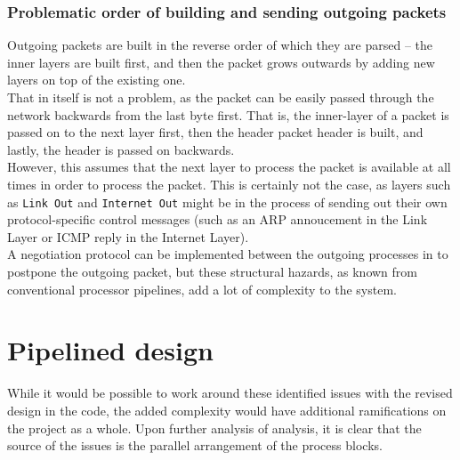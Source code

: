 \subsubsection{Problematic order of building and sending outgoing packets}
Outgoing packets are built in the reverse order of which they are parsed -- the 
inner layers are built first, and then the packet grows outwards by adding new 
layers on top of the existing one.\\
That in itself is not a problem, as the packet can be easily passed through the 
network backwards from the last byte first. That is, the inner-layer of a packet
is passed on to the next layer first, then the header packet header is built, 
and lastly, the header is passed on backwards.\\
However, this assumes that the next layer to process the packet is available at 
all times in order to process the packet. This is certainly not the case, as 
layers such as \texttt{Link Out} and \texttt{Internet Out} might be in the 
process of sending out their own protocol-specific control messages (such as 
an ARP annoucement in the Link Layer or ICMP reply in the Internet Layer).\\
A negotiation protocol can be implemented between the outgoing processes in to 
postpone the outgoing packet, but these structural hazards, as known from 
conventional processor pipelines, add a lot of complexity to the system.






\section{Pipelined design}
While it would be possible to work around these identified issues with the 
revised design in the code, the 
added complexity would have additional ramifications on the project as a whole.
Upon further analysis of analysis, it is clear that the source of the issues is 
the parallel arrangement of the process blocks.

